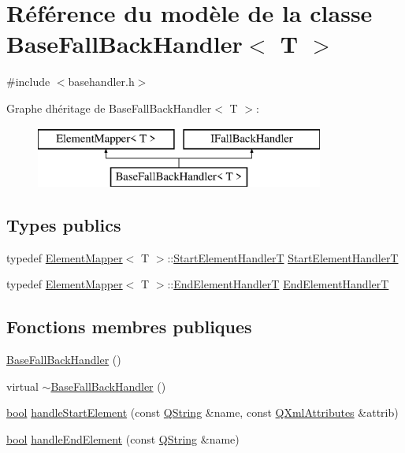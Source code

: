 \hypertarget{class_base_fall_back_handler}{}\section{Référence du modèle de la classe Base\+Fall\+Back\+Handler$<$ T $>$}
\label{class_base_fall_back_handler}


{\ttfamily \#include $<$basehandler.\+h$>$}

Graphe d\textquotesingle{}héritage de Base\+Fall\+Back\+Handler$<$ T $>$\+:\begin{figure}[H]
\begin{center}
\leavevmode
\includegraphics[height=2.000000cm]{class_base_fall_back_handler}
\end{center}
\end{figure}
\subsection*{Types publics}
\begin{DoxyCompactItemize}
\item 
typedef \hyperlink{class_element_mapper}{Element\+Mapper}$<$ T $>$\+::\hyperlink{class_element_mapper_afca37050650c0a9d475f4c87b9189eac}{Start\+Element\+Handler\+T} \hyperlink{class_base_fall_back_handler_ae0b24b5e229ec8d344add1a692d1df81}{Start\+Element\+Handler\+T}
\item 
typedef \hyperlink{class_element_mapper}{Element\+Mapper}$<$ T $>$\+::\hyperlink{class_element_mapper_a3d3ef233834e26837676018b71f5d1aa}{End\+Element\+Handler\+T} \hyperlink{class_base_fall_back_handler_a8bc73d6cf9414a905eab6051beb1461e}{End\+Element\+Handler\+T}
\end{DoxyCompactItemize}
\subsection*{Fonctions membres publiques}
\begin{DoxyCompactItemize}
\item 
\hyperlink{class_base_fall_back_handler_a5397d4295b292dedacf8b50274622c36}{Base\+Fall\+Back\+Handler} ()
\item 
virtual \hyperlink{class_base_fall_back_handler_a7bff88e39b553e07e63c73f89f5586b6}{$\sim$\+Base\+Fall\+Back\+Handler} ()
\item 
\hyperlink{qglobal_8h_a1062901a7428fdd9c7f180f5e01ea056}{bool} \hyperlink{class_base_fall_back_handler_a3664d08104bb0f5812bf7ab3b13b72ce}{handle\+Start\+Element} (const \hyperlink{class_q_string}{Q\+String} \&name, const \hyperlink{class_q_xml_attributes}{Q\+Xml\+Attributes} \&attrib)
\item 
\hyperlink{qglobal_8h_a1062901a7428fdd9c7f180f5e01ea056}{bool} \hyperlink{class_base_fall_back_handler_a8cf173185ef67fb38094494cb90e341f}{handle\+End\+Element} (const \hyperlink{class_q_string}{Q\+String} \&name)
\end{DoxyCompactItemize}

